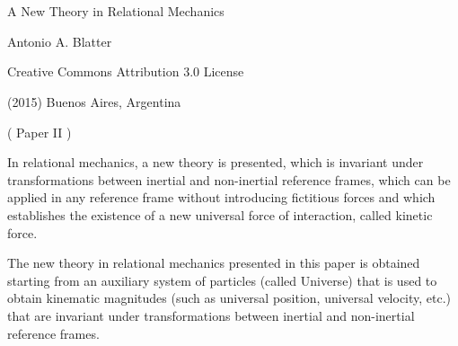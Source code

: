 \documentclass[10pt]{article}
\begin{document}
\newpage

\setcounter{page}{1}

\section*{}

\begin{center}

{\LARGE A New Theory in Relational Mechanics}

\bigskip \medskip

{\large Antonio A. Blatter}

\bigskip \medskip

\small

Creative Commons Attribution 3.0 License

\smallskip

(2015) Buenos Aires, Argentina

\medskip

{\sc ( Paper II )}

\smallskip

\bigskip \medskip

\parbox{107.40mm}{In relational mechanics, a new theory is presented, which is invariant under transformations between inertial and non-inertial reference frames, which can be applied in any reference frame without introducing fictitious forces and which establishes the existence of a new universal force of interaction, called kinetic force.}

\end{center}

\normalsize

\vspace{-1.20em}

\par {}

\par \bigskip\smallskip \noindent The new theory in relational mechanics presented in this paper is obtained starting from an auxiliary system of particles (called Universe) that is used to obtain kinematic magnitudes (such as universal position, universal velocity, etc.) that are invariant under transformations between inertial and non-inertial reference frames.
\end{document}
